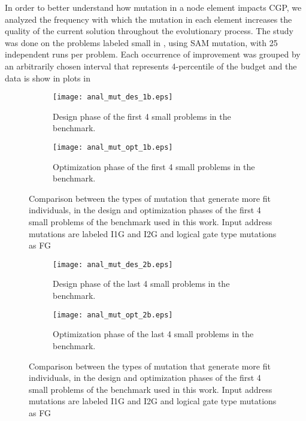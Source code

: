 \label{sec:ana}
In order to better understand how mutation in a node element impacts CGP, we analyzed the frequency with which the mutation in each element increases the quality of the current solution throughout the evolutionary process. The study was done on the problems labeled small in \cite{benchmark}, using SAM mutation, with 25 independent runs per problem. Each occurrence of improvement was grouped by an arbitrarily chosen interval that represents 4-percentile of the budget and the data is show in plots in 
%
\begin{figure}
\centering
  \begin{subfigure}[t]{0.8\textwidth}
    \texttt{[image: anal\_mut\_des\_1b.eps]}
    \caption{Design phase of the first 4 small problems in the benchmark.} \label{fig:2a}
  \end{subfigure}%
  \par
  \begin{subfigure}[c]{0.8\textwidth}
    \texttt{[image: anal\_mut\_opt\_1b.eps]}
    \caption{Optimization phase of the first 4 small problems in the benchmark.} \label{fig:2b}
  \end{subfigure}%
\caption{Comparison between the types of mutation that generate more fit individuals, in the design and optimization phases of the first 4 small problems of the benchmark used in this work. Input address mutations are labeled I1G and I2G and logical gate type mutations as FG} \label{fig:2}
\end{figure}

\begin{figure}
\centering
  \begin{subfigure}[t]{0.8\textwidth}
    \texttt{[image: anal\_mut\_des\_2b.eps]}
    \caption{Design phase of the last 4 small problems in the benchmark.} \label{fig:3a}
  \end{subfigure}%
  \par
  \begin{subfigure}[c]{0.8\textwidth}
    \texttt{[image: anal\_mut\_opt\_2b.eps]}
    \caption{Optimization phase of the last 4 small problems in the benchmark.} \label{fig:3b}
  \end{subfigure}%
\caption{Comparison between the types of mutation that generate more fit individuals, in the design and optimization phases of the first 4 small problems of the benchmark used in this work. Input address mutations are labeled I1G and I2G and logical gate type mutations as FG} \label{fig:3}
\end{figure}

